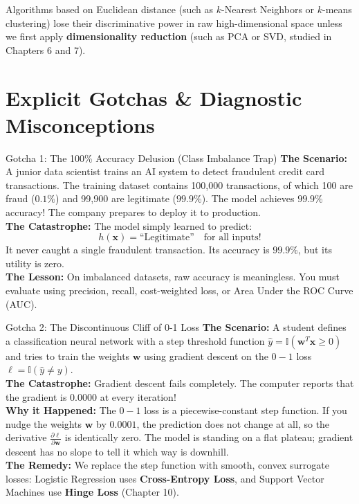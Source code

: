 Algorithms based on Euclidean distance (such as $k$-Nearest Neighbors or $k$-means clustering) lose their discriminative power in raw high-dimensional space unless we first apply \textbf{dimensionality reduction} (such as PCA or SVD, studied in Chapters 6 and 7).

\section{Explicit Gotchas \& Diagnostic Misconceptions}

\begin{trapbox}{Gotcha 1: The 100\% Accuracy Delusion (Class Imbalance Trap)}
\textbf{The Scenario:} A junior data scientist trains an AI system to detect fraudulent credit card transactions. The training dataset contains 100,000 transactions, of which 100 are fraud ($0.1\%$) and 99,900 are legitimate ($99.9\%$). The model achieves $99.9\%$ accuracy! The company prepares to deploy it to production. \\
\textbf{The Catastrophe:} The model simply learned to predict:
\begin{equation*}
h(\mathbf{x}) = \text{``Legitimate''} \quad \text{for all inputs!}
\end{equation*}
It never caught a single fraudulent transaction. Its accuracy is $99.9\%$, but its utility is zero. \\
\textbf{The Lesson:} On imbalanced datasets, raw accuracy is meaningless. You must evaluate using precision, recall, cost-weighted loss, or Area Under the ROC Curve (AUC).
\end{trapbox}

\begin{trapbox}{Gotcha 2: The Discontinuous Cliff of 0-1 Loss}
\textbf{The Scenario:} A student defines a classification neural network with a step threshold function $\hat{y} = \mathbb{I}(\mathbf{w}^T \mathbf{x} \ge 0)$ and tries to train the weights $\mathbf{w}$ using gradient descent on the $0-1$ loss $\ell = \mathbb{I}(\hat{y} \ne y)$. \\
\textbf{The Catastrophe:} Gradient descent fails completely. The computer reports that the gradient is $0.0000$ at every iteration! \\
\textbf{Why it Happened:} The $0-1$ loss is a piecewise-constant step function. If you nudge the weights $\mathbf{w}$ by $0.0001$, the prediction does not change at all, so the derivative $\frac{\partial \ell}{\partial \mathbf{w}}$ is identically zero. The model is standing on a flat plateau; gradient descent has no slope to tell it which way is downhill. \\
\textbf{The Remedy:} We replace the step function with smooth, convex surrogate losses: Logistic Regression uses \textbf{Cross-Entropy Loss}, and Support Vector Machines use \textbf{Hinge Loss} (Chapter 10).
\end{trapbox}

